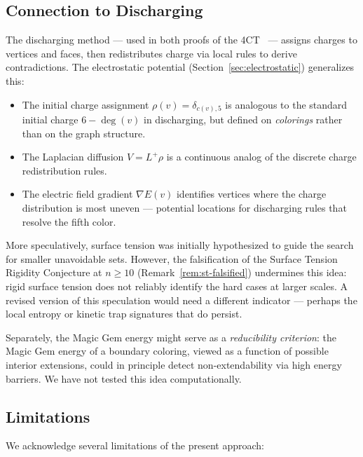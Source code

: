 \subsection{Connection to Discharging}\label{sec:discharging}

The discharging method — used in both proofs of the
4CT~\cite{appel1977, robertson1997} — assigns charges to vertices and
faces, then redistributes charge via local rules to derive
contradictions. The electrostatic potential
(Section~\ref{sec:electrostatic}) generalizes this:

\begin{itemize}
  \item The initial charge assignment $\rho(v) = \delta_{c(v), 5}$ is
    analogous to the standard initial charge $6 - \deg(v)$ in
    discharging, but defined on \emph{colorings} rather than on the
    graph structure.
  \item The Laplacian diffusion $V = L^+ \rho$ is a continuous analog
    of the discrete charge redistribution rules.
  \item The electric field gradient $\nabla E(v)$ identifies vertices
    where the charge distribution is most uneven — potential locations
    for discharging rules that resolve the fifth color.
\end{itemize}

More speculatively, surface tension was initially hypothesized to guide
the search for smaller unavoidable sets. However, the falsification of
the Surface Tension Rigidity Conjecture at $n \geq 10$
(Remark~\ref{rem:st-falsified}) undermines this idea: rigid surface
tension does not reliably identify the hard cases at larger scales. A
revised version of this speculation would need a different indicator —
perhaps the local entropy or kinetic trap signatures that do persist.

Separately, the Magic Gem energy might serve as a \emph{reducibility
criterion}: the Magic Gem energy of a boundary coloring, viewed as a
function of possible interior extensions, could in principle detect
non-extendability via high energy barriers. We have not tested this
idea computationally.

\subsection{Limitations}\label{sec:limitations}

We acknowledge several limitations of the present approach:

